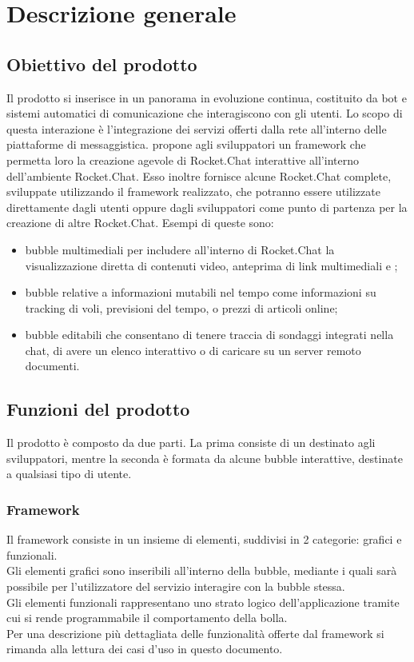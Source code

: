 \section{Descrizione generale}
\subsection{Obiettivo del prodotto}
Il prodotto si inserisce in un panorama in evoluzione continua, costituito da bot e sistemi automatici di comunicazione che interagiscono con gli utenti.
Lo scopo di  questa interazione è l'integrazione dei servizi offerti dalla rete all'interno delle piattaforme di messaggistica. 
\ProjectName{} propone agli sviluppatori un framework che permetta loro la creazione agevole di Rocket.Chat interattive all'interno dell'ambiente Rocket.Chat. Esso inoltre fornisce alcune Rocket.Chat complete, sviluppate utilizzando il framework realizzato, che potranno essere utilizzate direttamente dagli utenti oppure dagli sviluppatori come punto di partenza per la creazione di altre Rocket.Chat.
Esempi di queste sono: 
\begin{itemize}
	\item bubble multimediali per includere all'interno di Rocket.Chat la visualizzazione diretta di contenuti video, anteprima di link multimediali e ;
	\item bubble relative a informazioni mutabili nel tempo come informazioni su tracking di voli, previsioni del tempo, o prezzi di articoli online;
	\item bubble editabili che consentano di tenere traccia di sondaggi integrati nella chat, di avere un elenco interattivo o di caricare su un server remoto documenti.
\end{itemize}

\subsection{Funzioni del prodotto}
Il prodotto è composto da due parti. La prima consiste di un  destinato agli sviluppatori, mentre la seconda è formata da alcune bubble interattive, destinate a qualsiasi tipo di utente.

\subsubsection{Framework}
Il framework consiste in un insieme di elementi, suddivisi in 2 categorie: grafici e funzionali.\\
Gli elementi grafici sono  inseribili all'interno della bubble, mediante i quali sarà possibile per l'utilizzatore del servizio interagire con la bubble stessa.\\
Gli elementi funzionali rappresentano uno strato logico dell'applicazione tramite cui si rende programmabile il comportamento della bolla.\\
Per una descrizione più dettagliata delle funzionalità offerte dal framework si rimanda alla lettura dei casi d'uso in questo documento.

